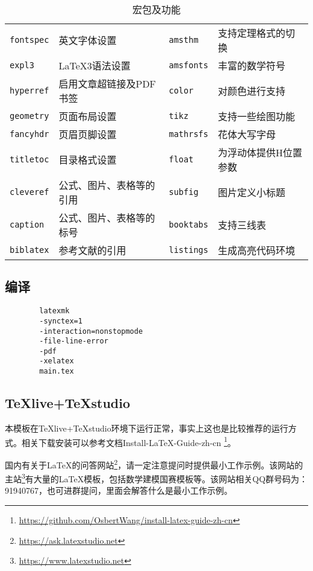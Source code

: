 \documentclass{hainanuthesis}
\theoremstyle{definition}
\begin{document}
	\begin{table}[H]
		\begin{center}
			\caption{宏包及功能}
			\label{tb:01}
			\begin{tabular}{llll}
				\verb|fontspec| & 英文字体设置           &\verb|amsthm  | & 支持定理格式的切换\\
				\verb|expl3   | & \LaTeX 3语法设置       &\verb|amsfonts| & 丰富的数学符号    \\
				\verb|hyperref| & 启用文章超链接及PDF书签 &\verb|color   | & 对颜色进行支持   \\
				\verb|geometry| & 页面布局设置           &\verb|tikz    |& 支持一些绘图功能   \\
				\verb|fancyhdr| & 页眉页脚设置           &\verb|mathrsfs|& 花体大写字母       \\
				\verb|titletoc| & 目录格式设置           &\verb|float   |& 为浮动体提供H位置参数\\
				\verb|cleveref| & 公式、图片、表格等的引用&\verb|subfig  | & 图片定义小标题 \\
				\verb|caption | & 公式、图片、表格等的标号&\verb|booktabs| & 支持三线表  \\
				\verb|biblatex| & 参考文献的引用   &\verb|listings| & 生成高亮代码环境     \\
			\end{tabular}
		\end{center}
	\end{table}
	
	\subsection{编译}
	
	\begin{verbatim}
		latexmk
		-synctex=1
		-interaction=nonstopmode
		-file-line-error
		-pdf
		-xelatex
		main.tex
	\end{verbatim}
	
	\subsection{TeXlive+TeXstudio}
	
	本模板在TeXlive+TeXstudio环境下运行正常，事实上这也是比较推荐的运行方式。相关下载安装可以参考文档Install-LaTeX-Guide-zh-cn \footnote{\href{https://github.com/OsbertWang/install-latex-guide-zh-cn}{https://github.com/OsbertWang/install-latex-guide-zh-cn}}。
	
	国内有关于\LaTeX 的问答网站\footnote{\href{https://ask.latexstudio.net}{https://ask.latexstudio.net}}，请一定注意提问时提供最小工作示例。该网站的主站\footnote{\href{https://www.latexstudio.net}{https://www.latexstudio.net}}有大量的\LaTeX 模板，包括数学建模国赛模板等。该网站相关QQ群号码为：91940767，也可进群提问，里面会解答什么是最小工作示例。
	
\end{document}
